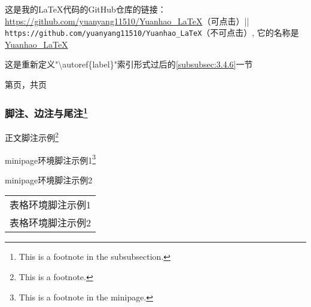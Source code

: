 \documentclass[twoside]{ctexart} %
\begin{document}
            这是我的\LaTeX 代码的GitHub仓库的链接：\url{https://github.com/yuanyang11510/Yuanhao_LaTeX}（可点击）|| %
            \nolinkurl{https://github.com/yuanyang11510/Yuanhao_LaTeX}（不可点击）, %
            它的名称是\href{https://github.com/yuanyang11510/Yuanhao_LaTeX}{Yuanhao\_LaTeX} 

            \renewcommand*{\subsubsectionautorefname}{次次标题}
            这是重新定义"\textbackslash autoref\{label\}"索引形式过后的\autoref{subsubsec:3.4.6}一节
        
            第\thepage 页，共\pageref{LastPage}页
            
        \subsubsection{脚注、边注与尾注\protect\footnote{This is a footnote in the subsubsection.}} %
            正文脚注示例\footnote{This is a footnote.}

            \begin{minipage}{\linewidth}
                minipage环境脚注示例1\footnote{This is a footnote in the minipage.} %

                minipage环境脚注示例2\footnotemark %
            \end{minipage}

            \begin{tabular}{l}
                表格环境脚注示例1\footnotemark\\
                表格环境脚注示例2\footnotemark
            \end{tabular}
            
\end{document}
